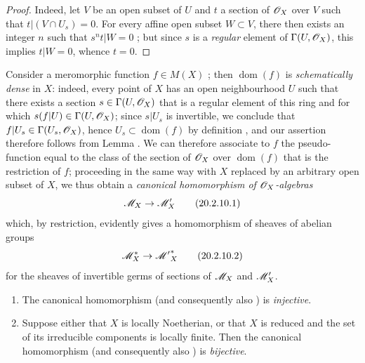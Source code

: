 \begin{proof}
Indeed, let $V$ be an open subset of $U$ and $t$ a section of $\mathscr{O}_X$ over $V$ such that $t|(V\cap U_s)=0$.
For every affine open subset $W\subset V$, there then exists an integer $n$ such that $s^nt|W=0$ ; but since $s$ is a \emph{regular} element of $\Gamma(U,\mathscr{O}_X)$, this implies $t|W=0$, whence $t=0$.
\end{proof}

\begin{env}[20.2.10]
\label{IV.20.2.10}
Consider a meromorphic function $f\in M(X)$ ; then $\operatorname{dom}(f)$ is \emph{schematically dense} in $X$: indeed, every point of $X$ has an open neighbourhood $U$ such that there exists a section $s\in\Gamma(U,\mathscr{O}_X)$ that is a regular element of this ring and for which $s(f|U)\in\Gamma(U,\mathscr{O}_X)$; since $s|U_s$ is invertible, we conclude that $f|U_s\in\Gamma(U_s,\mathscr{O}_X)$, hence $U_s\subset\operatorname{dom}(f)$ by definition , and our assertion therefore follows from Lemma .
We can therefore associate to $f$ the pseudo-function equal to the class of the section of $\mathscr{O}_X$ over $\operatorname{dom}(f)$ that is the restriction of $f$; proceeding in the same way with $X$ replaced by an arbitrary open subset of $X$, we thus obtain a \emph{canonical homomorphism of $\mathscr{O}_X$-algebras}
\[
\label{IV.20.2.10.1}
  \mathscr{M}_X\to\mathscr{M}'_X
  \tag{20.2.10.1}
\]
which, by restriction, evidently gives a homomorphism of sheaves of abelian groups
\[
\label{IV.20.2.10.2}
  \mathscr{M}_X^*\to{\mathscr{M}'}^*_X
  \tag{20.2.10.2}
\]
for the sheaves of invertible germs of sections of $\mathscr{M}_X$ and $\mathscr{M}'_X$.
\end{env}

\begin{proposition}[20.2.11]\label{IV.20.2.11}
\medskip
\begin{enumerate}[label=\emph{(\roman*)}]
  \item The canonical homomorphism \emph{} (and consequently also \emph{}) is \emph{injective}.
  \item Suppose either that $X$ is locally Noetherian, or that $X$ is reduced and the set of its irreducible components is locally finite.
  Then the canonical homomorphism \emph{} (and consequently also \emph{}) is \emph{bijective}.
\end{enumerate}
\end{proposition}

